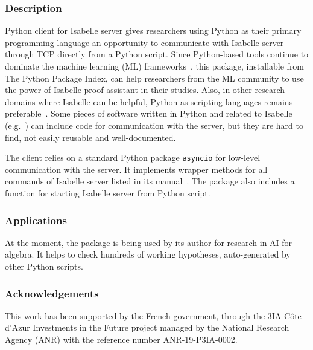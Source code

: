 %
%
%
%


\maketool

\subsubsection{Description}
Python client for Isabelle server gives researchers using Python as their primary programming language an opportunity to communicate with Isabelle server through TCP directly from a Python script. Since Python-based tools continue to dominate the machine learning (ML) frameworks~\cite{Kaggle2020MLSurvey}, this package, installable from The Python Package Index, can help researchers from the ML community to use the power of Isabelle proof assistant in their studies. Also, in other research domains where Isabelle can be helpful, Python as scripting languages remains preferable~\cite{DBLP:journals/sttt/DragomirPT20}. Some pieces of software written in Python and related to Isabelle (e.g.~\cite{ProvingContestBackends}) can include code for communication with the server, but they are hard to find, not easily reusable and well-documented.

The client relies on a standard Python package \texttt{asyncio} for low-level communication with the server. It implements wrapper methods for all commands of Isabelle server listed in its manual~\cite{isabelle-system}. The package also includes a function for starting Isabelle server from Python script.

\subsubsection{Applications} At the moment, the package is being used by its author for research in AI for algebra. It helps to check hundreds of working hypotheses, auto-generated by other Python scripts.

\subsubsection{Acknowledgements} This work has been supported by the French government, through the 3IA Côte d’Azur Investments in the Future project managed by the National Research Agency (ANR) with the reference number ANR-19-P3IA-0002.

